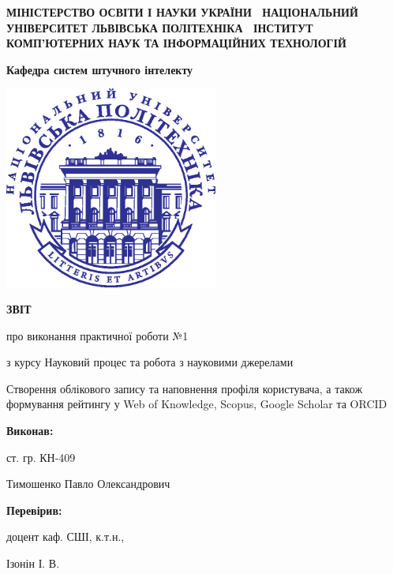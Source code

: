 \documentclass[oneside,14pt,a4paper]{extreport}
\newcommand \labno    {1}
\newcommand \course   {Науковий процес та робота з науковими джерелами}
\newcommand \group    {409}
\newcommand \lecturer {Ізонін І. В.}
\newcommand \theme    {Створення облікового запису та наповнення профіля користувача, а також формування рейтингу у Web of Knowledge, Scopus, Google Scholar та ORCID}
\begin{document}
\begin{titlepage}

\centering
 \textbf{
  МІНІСТЕРСТВО ОСВІТИ І НАУКИ УКРАЇНИ \
  НАЦІОНАЛЬНИЙ УНІВЕРСИТЕТ \flqq{}ЛЬВІВСЬКА ПОЛІТЕХНІКА\frqq{} \
  ІНСТИТУТ КОМП’ЮТЕРНИХ НАУК ТА ІНФОРМАЦІЙНИХ ТЕХНОЛОГІЙ
 }

\vspace{0.5cm}
 \textbf{
  Кафедра систем штучного інтелекту
}

\vspace*{\fill}

  {
    \centering
    \includegraphics[width=7cm]{imgs/logo.eps}
  }

\vspace{1cm}

  {\textbf{ЗВІТ} \par{}
  {про виконання практичної роботи №\labno}
   \par}
  {з курсу \flqq{}\course\frqq{} \par}

\vspace{1cm} \theme

\raggedleft\vfill

 {\textbf{Виконав:} \par}
 {ст. гр. КН-\group \par}
 {Тимошенко Павло Олександрович \par}


 {\textbf{Перевірив:} \par}
 {доцент каф. СШІ, к.т.н.,}
 {\lecturer \par}

\vspace{1cm}


\end{titlepage}
\end{document}
